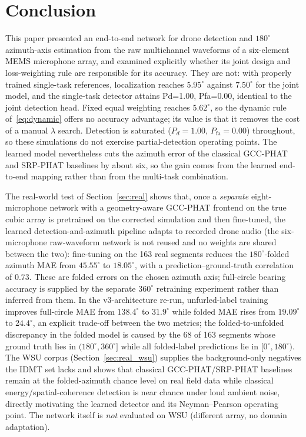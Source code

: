 \documentclass[sensors,article,submit,pdftex,moreauthors]{Definitions/mdpi}
\begin{document}
\section{Conclusion}
\label{sec:conclusion}
This paper presented an end-to-end network for drone detection and $180^\circ$ azimuth-axis estimation from the raw multichannel waveforms of a six-element MEMS microphone array, and examined explicitly whether its joint design and loss-weighting rule are responsible for its accuracy. They are not: with properly trained single-task references, localization reaches $5.95^\circ$ against $7.50^\circ$ for the joint model, and the single-task detector attains Pd=1.00, Pfa=0.00, identical to the joint detection head. Fixed equal weighting reaches $5.62^\circ$, so the dynamic rule of~\eqref{eq:dynamic} offers no accuracy advantage; its value is that it removes the cost of a manual $\lambda$ search. Detection is saturated ($P_d=1.00$, $P_{\mathrm{fa}}=0.00$) throughout, so these simulations do not exercise partial-detection operating points. The learned model nevertheless cuts the azimuth error of the classical GCC-PHAT and SRP-PHAT baselines by about six, so the gain comes from the learned end-to-end mapping rather than from the multi-task combination.

The real-world test of Section~\ref{sec:real} shows that, once a \emph{separate} eight-microphone network with a geometry-aware GCC-PHAT frontend on the true cubic array is pretrained on the corrected simulation and then fine-tuned, the learned detection-and-azimuth pipeline adapts to recorded drone audio (the six-microphone raw-waveform network is not reused and no weights are shared between the two): fine-tuning on the 163 real segments reduces the $180^\circ$-folded azimuth MAE from $45.55^\circ$ to $18.05^\circ$, with a prediction--ground-truth correlation of $0.73$. These are folded errors on the chosen azimuth axis; full-circle bearing accuracy is supplied by the separate $360^\circ$ retraining experiment rather than inferred from them. In the v3-architecture re-run, unfurled-label training improves full-circle MAE from $138.4^\circ$ to $31.9^\circ$ while folded MAE rises from $19.09^\circ$ to $24.4^\circ$, an explicit trade-off between the two metrics; the folded-to-unfolded discrepancy in the folded model is caused by the 68 of 163 segments whose ground truth lies in $(180^\circ,360^\circ]$ while all folded-label predictions lie in $[0^\circ,180^\circ)$. The WSU corpus (Section~\ref{sec:real_wsu}) supplies the background-only negatives the IDMT set lacks and shows that classical GCC-PHAT/SRP-PHAT baselines remain at the folded-azimuth chance level on real field data while classical energy/spatial-coherence detection is near chance under loud ambient noise, directly motivating the learned detector and its Neyman--Pearson operating point. The network itself is \emph{not} evaluated on WSU (different array, no domain adaptation).
\end{document}
